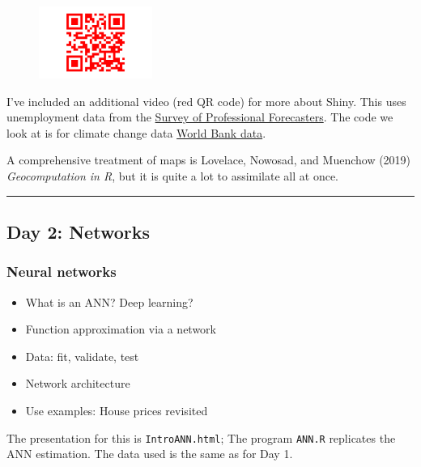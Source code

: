 \documentclass[
  letterpaper,
]{book}
\providecommand{\tightlist}{%
  \setlength{\itemsep}{0pt}\setlength{\parskip}{0pt}}\usepackage{longtable,booktabs,array}
\begin{document}
\begin{figure}

\hfill{} \includegraphics[width=0.33\textwidth,height=\textheight]{./R2021_files/figure-pdf/unnamed-chunk-2-1.pdf}

\end{figure}

I've included an additional video (red QR code) for more about Shiny.
This uses unemployment data from the
\href{https://www.philadelphiafed.org/surveys-and-data/real-time-data-research/survey-of-professional-forecasters}{Survey
of Professional Forecasters}. The code we look at is for climate change
data \href{https://climateknowledgeportal.worldbank.org/}{World Bank
data}.

A comprehensive treatment of maps is Lovelace, Nowosad, and Muenchow
(2019) \emph{Geocomputation in R}, but it is quite a lot to assimilate
all at once.

\begin{center}\rule{0.5\linewidth}{0.5pt}\end{center}

\hypertarget{day-2-networks}{%
\subsection{Day 2: Networks}\label{day-2-networks}}

\hypertarget{neural-networks}{%
\subsubsection{Neural networks}\label{neural-networks}}

\begin{itemize}
\tightlist
\item
  What is an ANN? Deep learning?
\item
  Function approximation via a network
\item
  Data: fit, validate, test
\item
  Network architecture
\item
  Use examples: House prices revisited
\end{itemize}

The presentation for this is \texttt{IntroANN.html}; The program
\texttt{ANN.R} replicates the ANN estimation. The data used is the same
as for Day 1.
\end{document}
